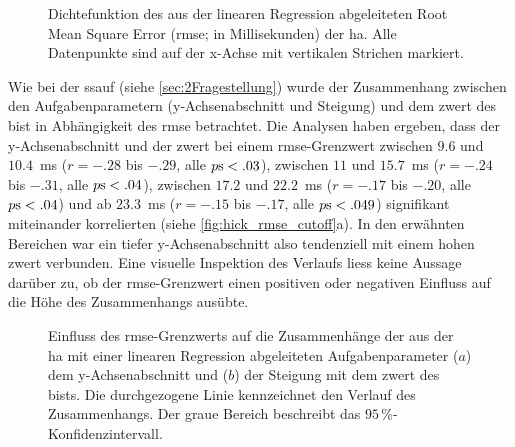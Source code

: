 \documentclass[11pt, twoside, a4paper]{book}		%
\begin{document}
\begin{figure}[t]
	\centering
	\begin{adjustbox}{width=1\textwidth}
		
	\end{adjustbox}
	\caption[Dichtefunktion des RMSE]{Dichtefunktion des aus der linearen Regression abgeleiteten Root Mean Square Error (\gls{rmse}; in Millisekunden) der \gls{ha}.  Alle Datenpunkte sind auf der x-Achse mit vertikalen Strichen markiert.}
	\label{fig:hick_rmse_density}
\end{figure}

Wie bei der \gls{ssauf} (siehe \autoref{sec:2Fragestellung}) wurde der Zusammenhang zwischen den Aufgabenparametern (y-Achsenabschnitt und Steigung) und dem \gls{zwert} des \gls{bist} in Abhängigkeit des \gls{rmse} betrachtet. Die Analysen haben ergeben, dass der y-Achsenabschnitt und der \gls{zwert} bei einem \gls{rmse}-Grenzwert zwischen $9.6$ und $10.4$~ms ($r = -.28$ bis $ -.29$, alle $p\textnormal{s} < .03$), zwischen $11$ und $15.7$~ms ($r = -.24$ bis $ -.31$, alle $p\textnormal{s} < .04$), zwischen $17.2$ und $22.2$~ms ($r = -.17$ bis $ -.20$, alle $p\textnormal{s} < .04$) und ab $23.3$~ms ($r = -.15$ bis $ -.17$, alle $p\textnormal{s} < .049$) signifikant miteinander korrelierten (siehe \autoref{fig:hick_rmse_cutoff}a). In den erwähnten Bereichen war ein tiefer y-Achsenabschnitt also tendenziell mit einem hohen \gls{zwert} verbunden. Eine visuelle Inspektion des Verlaufs liess keine Aussage darüber zu, ob der \gls{rmse}-Grenzwert einen positiven oder negativen Einfluss auf die Höhe des Zusammenhangs ausübte.


\begin{figure}[htbp]
	\centering
	\begin{adjustbox}{width=1\textwidth}
	\end{adjustbox}
	\newline
	\begin{adjustbox}{width=1\textwidth}
	\end{adjustbox}
	
	\caption[RMSE Einfluss Hick]{Einfluss des \gls{rmse}-Grenzwerts auf die Zusammenhänge der aus der \gls{ha} mit einer linearen Regression abgeleiteten Aufgabenparameter ($a$) dem y-Achsenabschnitt und ($b$) der Steigung mit dem \gls{zwert} des \gls{bist}s. Die durchgezogene Linie kennzeichnet den Verlauf des Zusammenhangs. Der graue Bereich beschreibt das $95\,\%$-Konfidenzintervall.}
	\label{fig:hick_rmse_cutoff}
\end{figure}
\end{document}
